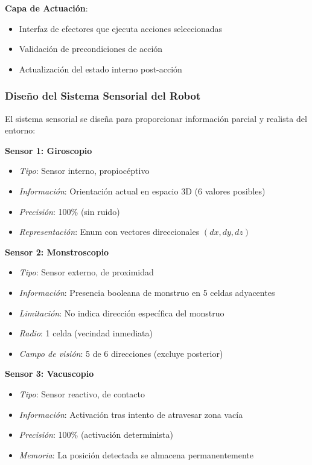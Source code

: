 \documentclass[10pt,twocolumn]{article}
\begin{document}
\textbf{Capa de Actuación}:
\begin{itemize}
\item Interfaz de efectores que ejecuta acciones seleccionadas
\item Validación de precondiciones de acción
\item Actualización del estado interno post-acción
\end{itemize}

\subsubsection{Diseño del Sistema Sensorial del Robot}

El sistema sensorial se diseña para proporcionar información parcial y realista del entorno:

\textbf{Sensor 1: Giroscopio}
\begin{itemize}
\item \textit{Tipo}: Sensor interno, propiocéptivo
\item \textit{Información}: Orientación actual en espacio 3D (6 valores posibles)
\item \textit{Precisión}: 100\% (sin ruido)
\item \textit{Representación}: Enum con vectores direccionales $(dx, dy, dz)$
\end{itemize}

\textbf{Sensor 2: Monstroscopio}
\begin{itemize}
\item \textit{Tipo}: Sensor externo, de proximidad
\item \textit{Información}: Presencia booleana de monstruo en 5 celdas adyacentes
\item \textit{Limitación}: No indica dirección específica del monstruo
\item \textit{Radio}: 1 celda (vecindad inmediata)
\item \textit{Campo de visión}: 5 de 6 direcciones (excluye posterior)
\end{itemize}

\textbf{Sensor 3: Vacuscopio}
\begin{itemize}
\item \textit{Tipo}: Sensor reactivo, de contacto
\item \textit{Información}: Activación tras intento de atravesar zona vacía
\item \textit{Precisión}: 100\% (activación determinista)
\item \textit{Memoria}: La posición detectada se almacena permanentemente
\end{itemize}
\end{document}
